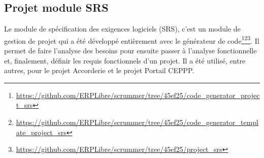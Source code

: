 






\subsection{Projet module SRS}

Le module de spécification des exigences logiciels (SRS), c’est un module de gestion de projet qui a été développé entièrement avec le générateur de code\footnote{\url{https://github.com/ERPLibre/scrummer/tree/45ef25/code_generator_project_srs}}\footnote{\url{https://github.com/ERPLibre/scrummer/tree/45ef25/code_generator_template_project_srs}}\footnote{\url{https://github.com/ERPLibre/scrummer/tree/45ef25/project_srs}}. Il permet de faire l’analyse des besoins pour ensuite passer à l’analyse fonctionnelle et, finalement, définir les requis fonctionnels d’un projet. Il a été utilisé, entre autres, pour le projet Accorderie et le projet Portail CEPPP.

